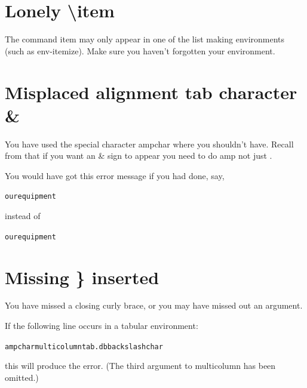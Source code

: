
\section{Lonely \textbackslash item}

The command \gls{item} may only appear in one of the list making
environments (such as \gls{env-itemize}).  Make sure you haven't
forgotten your environment.


\section{Misplaced alignment tab character \&}

You have used the special character \gls{ampchar} where you shouldn't
have.  Recall from  that if you want an \& sign 
to appear you need to do \gls{amp} not just .

You would have got this error message if you had done, say,
\begin{alltt}\wrong
{} our equipment
\end{alltt}
instead of
\begin{alltt}\correct
{} our equipment
\end{alltt}


\section{Missing \} inserted}

You have missed a closing curly brace, or you may have missed out an
argument.

If the following line occurs in a tabular environment:
\begin{alltt}\wrong
 \gls{ampchar} \gls{multicolumn}\gls{tab.dbbackslashchar}
\end{alltt}
this will produce the error. (The third argument to 
\gls{multicolumn} has been omitted.)


